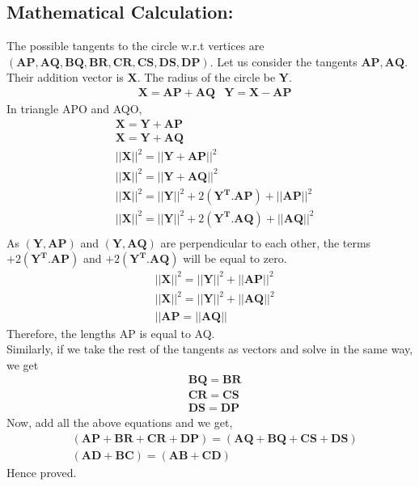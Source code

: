 \documentclass[a4paper,12pt,twocolumn]{article}
\let\vec\mathbf
\begin{document}
\subsection{Mathematical Calculation:}
The possible tangents to the circle w.r.t vertices are $\vec{(AP,AQ,BQ,BR,CR,CS,DS,DP)}$. Let us consider the tangents $\vec{AP,AQ}$. Their addition vector is $\vec{X}$. The radius of the circle be $\vec{Y}$.
\begin{align*}
&\vec{X} = \vec{AP+AQ}
&\vec{Y} = \vec{X-AP}
\end{align*}
In triangle APO and AQO,  
\begin{align*}
&\vec{X}= \vec{Y+AP}\\
&\vec{X}= \vec{Y+AQ}\\
&||\vec{X}||^2 = ||\vec{Y+AP}||^2\\
&||\vec{X}||^2 = ||\vec{Y+AQ}||^2\\
&||\vec{X}||^2 = ||\vec{Y}||^2 +2(\vec{Y^T.AP}) +||\vec{AP}||^2\\
&||\vec{X}||^2 = ||\vec{Y}||^2 +2(\vec{Y^T.AQ}) +||\vec{AQ}||^2\\
\end{align*}
As $\vec{(Y,AP)}$ and $\vec{(Y,AQ)}$ are perpendicular to each other, the terms $+2(\vec{Y^T.AP})$ and $+2(\vec{Y^T.AQ})$ will be equal to zero. 
\begin{align*}
&||\vec{X}||^2 = ||\vec{Y}||^2 + ||\vec{AP}||^2 \\
&||\vec{X}||^2 = ||\vec{Y}||^2 + ||\vec{AQ}||^2\\
&||\vec{AP} = ||\vec{AQ}||
\end{align*}
Therefore, the lengths AP is equal to AQ.\\
Similarly, if we take the rest of the tangents as vectors and solve in the same way, we get
\begin{align}
	&\vec{BQ} = \vec{BR}\\
	&\vec{CR} = \vec{CS}\\
	&\vec{DS} = \vec{DP}
\end{align}
Now, add all the above equations and we get,
\begin{align}
	&\vec{(AP+BR+CR+DP)} = \vec{(AQ+BQ+CS+DS)}\\
	&\vec{(AD+BC)} = \vec{(AB+CD)}
\end{align}
Hence proved.
\end{document}
